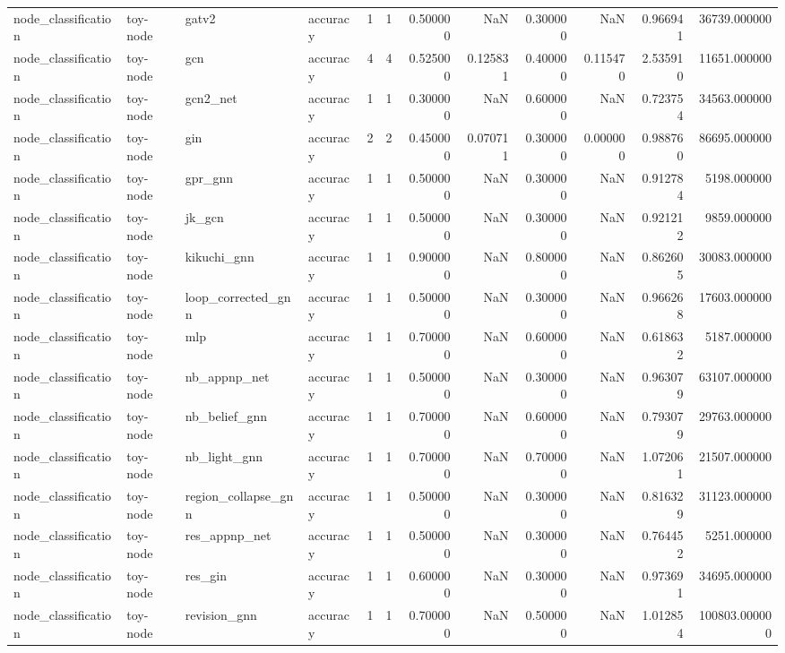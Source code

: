 \begin{tabular}{llllrrrrrrrr}
node_classification & toy-node & gatv2 & accuracy & 1 & 1 & 0.500000 & NaN & 0.300000 & NaN & 0.966941 & 36739.000000 \\
node_classification & toy-node & gcn & accuracy & 4 & 4 & 0.525000 & 0.125831 & 0.400000 & 0.115470 & 2.535910 & 11651.000000 \\
node_classification & toy-node & gcn2_net & accuracy & 1 & 1 & 0.300000 & NaN & 0.600000 & NaN & 0.723754 & 34563.000000 \\
node_classification & toy-node & gin & accuracy & 2 & 2 & 0.450000 & 0.070711 & 0.300000 & 0.000000 & 0.988760 & 86695.000000 \\
node_classification & toy-node & gpr_gnn & accuracy & 1 & 1 & 0.500000 & NaN & 0.300000 & NaN & 0.912784 & 5198.000000 \\
node_classification & toy-node & jk_gcn & accuracy & 1 & 1 & 0.500000 & NaN & 0.300000 & NaN & 0.921212 & 9859.000000 \\
node_classification & toy-node & kikuchi_gnn & accuracy & 1 & 1 & 0.900000 & NaN & 0.800000 & NaN & 0.862605 & 30083.000000 \\
node_classification & toy-node & loop_corrected_gnn & accuracy & 1 & 1 & 0.500000 & NaN & 0.300000 & NaN & 0.966268 & 17603.000000 \\
node_classification & toy-node & mlp & accuracy & 1 & 1 & 0.700000 & NaN & 0.600000 & NaN & 0.618632 & 5187.000000 \\
node_classification & toy-node & nb_appnp_net & accuracy & 1 & 1 & 0.500000 & NaN & 0.300000 & NaN & 0.963079 & 63107.000000 \\
node_classification & toy-node & nb_belief_gnn & accuracy & 1 & 1 & 0.700000 & NaN & 0.600000 & NaN & 0.793079 & 29763.000000 \\
node_classification & toy-node & nb_light_gnn & accuracy & 1 & 1 & 0.700000 & NaN & 0.700000 & NaN & 1.072061 & 21507.000000 \\
node_classification & toy-node & region_collapse_gnn & accuracy & 1 & 1 & 0.500000 & NaN & 0.300000 & NaN & 0.816329 & 31123.000000 \\
node_classification & toy-node & res_appnp_net & accuracy & 1 & 1 & 0.500000 & NaN & 0.300000 & NaN & 0.764452 & 5251.000000 \\
node_classification & toy-node & res_gin & accuracy & 1 & 1 & 0.600000 & NaN & 0.300000 & NaN & 0.973691 & 34695.000000 \\
node_classification & toy-node & revision_gnn & accuracy & 1 & 1 & 0.700000 & NaN & 0.500000 & NaN & 1.012854 & 100803.000000 \\

\end{tabular}
